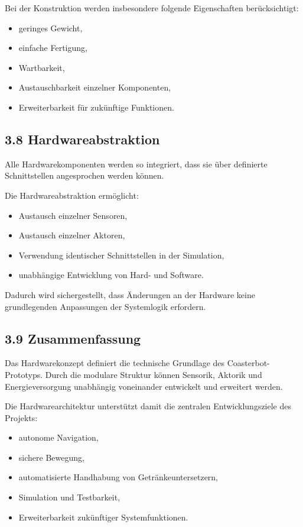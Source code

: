 \documentclass[
  a4paper,
  12pt,
  DIV=12,        %
  parskip=half,  %
  headings=small %
]{scrartcl}
\theoremstyle{definition}
\providecommand{\tightlist}{%
  \setlength{\itemsep}{0pt}\setlength{\parskip}{0pt}}
\theoremstyle{definition}
\providecommand{\tightlist}{%
  \setlength{\itemsep}{0pt}\setlength{\parskip}{0pt}}
\begin{document}
Bei der Konstruktion werden insbesondere folgende Eigenschaften
berücksichtigt:

\begin{itemize}
\tightlist
\item
  geringes Gewicht,
\item
  einfache Fertigung,
\item
  Wartbarkeit,
\item
  Austauschbarkeit einzelner Komponenten,
\item
  Erweiterbarkeit für zukünftige Funktionen.
\end{itemize}

\subsection{3.8 Hardwareabstraktion}\label{hardwareabstraktion}

Alle Hardwarekomponenten werden so integriert, dass sie über definierte
Schnittstellen angesprochen werden können.

Die Hardwareabstraktion ermöglicht:

\begin{itemize}
\tightlist
\item
  Austausch einzelner Sensoren,
\item
  Austausch einzelner Aktoren,
\item
  Verwendung identischer Schnittstellen in der Simulation,
\item
  unabhängige Entwicklung von Hard- und Software.
\end{itemize}

Dadurch wird sichergestellt, dass Änderungen an der Hardware keine
grundlegenden Anpassungen der Systemlogik erfordern.

\subsection{3.9 Zusammenfassung}\label{zusammenfassung-1}

Das Hardwarekonzept definiert die technische Grundlage des
Coasterbot-Prototyps. Durch die modulare Struktur können Sensorik,
Aktorik und Energieversorgung unabhängig voneinander entwickelt und
erweitert werden.

Die Hardwarearchitektur unterstützt damit die zentralen
Entwicklungsziele des Projekts:

\begin{itemize}
\tightlist
\item
  autonome Navigation,
\item
  sichere Bewegung,
\item
  automatisierte Handhabung von Getränkeuntersetzern,
\item
  Simulation und Testbarkeit,
\item
  Erweiterbarkeit zukünftiger Systemfunktionen.
\end{itemize}
\end{document}
